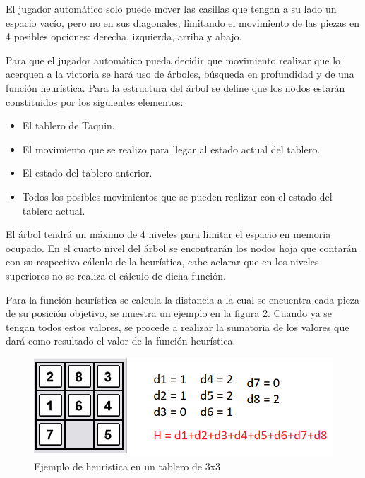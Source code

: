 \documentclass[a4paper]{article}
\theoremstyle{plain}
\theoremstyle{definition}
\begin{document}
	    El jugador automático solo puede mover las casillas que tengan a su lado un espacio vacío, pero no en sus diagonales, limitando el movimiento de las piezas en 4 posibles opciones: derecha, izquierda, arriba y abajo.\newline
	    
	    Para que el jugador automático pueda decidir que movimiento realizar que lo acerquen a la victoria se hará uso de árboles, búsqueda en profundidad y de una función heurística. Para la estructura del árbol se define que los nodos estarán constituidos por los siguientes elementos:
	    \newline
	    \begin{itemize}
	       \item El tablero de Taquin.
	       \item El movimiento que se realizo para llegar al estado actual del tablero.
	       \item El estado del tablero anterior.
	       \item Todos los posibles movimientos que se pueden realizar con el estado del tablero actual.
	    \end{itemize}
	    
	    El árbol tendrá un máximo de 4 niveles para limitar el espacio en memoria ocupado. En el cuarto nivel del árbol se encontrarán los nodos hoja que contarán con su respectivo cálculo de la heurística, cabe aclarar que en los niveles superiores no se realiza el cálculo de dicha función.\newline
	    
	    Para la función heurística se calcula la distancia a la cual se encuentra cada pieza de su posición objetivo, se muestra un ejemplo en la figura 2. Cuando ya se tengan todos estos valores, se procede a realizar la sumatoria de los valores que dará como resultado el valor de la función heurística.\newline
	    
	    \begin{figure}[h]
        
        \centering
        \includegraphics[scale=0.4]{figura2.png}
        \caption{Ejemplo de heuristica en un tablero de 3x3}
        \end{figure}
	    
\end{document}
